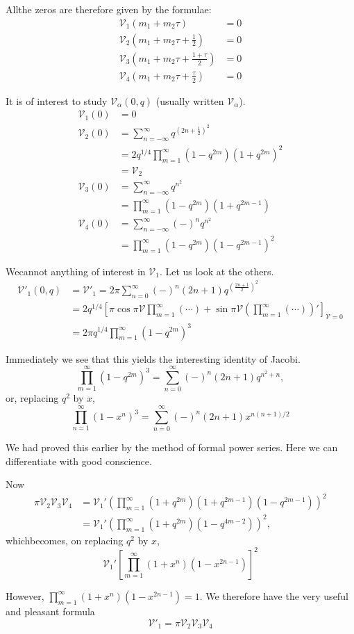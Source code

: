 All\pageoriginale the zeros are therefore given by the formulae:
\begin{align*}
  \mathscr{V}_1 (m_1+ m_2 \tau) & = 0\\
  \mathscr{V}_2 \left(m_1+m_2 \tau + \frac{1}{2}\right)& =0\\
  \mathscr{V}_3 \left(m_1+m_2 \tau + \frac{1+\tau}{2}\right)& =0\\
  \mathscr{V}_4 \left(m_1+m_2 \tau + \frac{\tau}{2}\right)& =0
\end{align*}

It is of interest to study $\mathscr{V}_\alpha (0, q)$ (usually
written $\mathscr{V}_\alpha$).
\begin{align*}
  \mathscr{V}_1 (0) & =0 \\
  \mathscr{V}_2(0) & =\sum^\infty_{n=-\infty} q^{\left(2n+
    \frac{1}{2}\right)^2}\\
  & = 2 q^{1/4} \prod^\infty_{m=1} (1- q^{2m})(1+q^{2m})^2\\
  & = \mathscr{V}_2\\
  \mathscr{V}_3 (0) & = \sum^\infty_{n=-\infty} q^{n^2}\\
  & = \prod^\infty_{m=1} (1- q^{2m})(1+ q^{2m-1})\\
  \mathscr{V}_4(0) & = \sum^\infty_{n=-\infty} (-)^n q^{n^2}\\
  & = \prod^\infty_{m=1} (1- q^{2m})(1-q^{2m-1})^2
\end{align*}

We\pageoriginale cannot anything of interest in $\mathscr{V}_1$. Let
us look at the others.
\begin{align*}
  \mathscr{V}'_1 (0, q) & = \mathscr{V}'_1= 2 \pi \sum^\infty_{n=0}
  (-)^n (2n+1)q^{\left(\frac{2n+1}{2}\right)^2}\\
  & = 2 q^{1/4} \left[ \pi \cos \pi \mathscr{V} \prod^\infty_{m=1}
    (\cdots) + \sin \pi \mathscr{V} \left(\prod^\infty_{m=1}(\cdots)
    \right)' \right]_{\mathscr{V}=0}\\
  & = 2 \pi q^{1/4} \prod^\infty_{m=1} (1- q^{2m})^3
\end{align*}

Immediately we see that this yields the interesting identity of
Jacobi.
$$
\prod^\infty_{m=1} (1- q^{2m})^3 = \sum^\infty_{n=0} (-)^n (2n+1)q^{n^2+n},
$$
or, replacing $q^2$ by $x$,
$$
\prod^\infty_{n=1} (1- x^n)^3 = \sum^\infty_{n=0} (-)^n (2n+1) x^{n(n+1)/2}
$$

We had proved this earlier by the method of formal power series. Here
we can differentiate with good conscience. 

Now
\begin{align*}
  \pi \mathscr{V}_2 \mathscr{V}_3 \mathscr{V}_4 & = \mathscr{V}_1'
  \left( \prod^\infty_{m=1} (1+ q^{2m}) (1+
  q^{2m-1})(1-q^{2m-1})\right)^2\\
  & = \mathscr{V}_1' \left( \prod^\infty_{m=1} (1+q^{2m})(1-q^{4m-2})\right)^2,
\end{align*}
which\pageoriginale becomes, on replacing $q^2$ by $x$,
$$
\mathscr{V}_1' \left[ \prod^\infty_{m=1} (1+ x^n)\left(1-x^{2n-1}\right)\right]^2
$$ 

However, $\prod\limits^\infty_{m=1} (1+x^n)(1-x^{2n-1})=1$. We
therefore have the very useful and pleasant formula
$$
\mathscr{V}'_1 = \pi \mathscr{V}_2 \mathscr{V}_3 \mathscr{V}_4
$$
